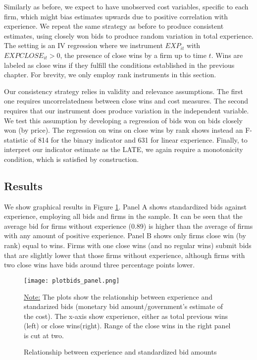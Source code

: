 Similarly as before, we expect to have unobserved cost variables, specific to each firm, which might bias estimates upwards due to positive correlation with experience. We repeat the same strategy as before to produce consistent estimates, using closely won bids to produce random variation in total experience. The setting is an IV regression where we instrument $EXP_{it}$ with $EXPCLOSE_{it}>0$, the presence of close wins by a firm up to time $t$. Wins are labeled as close wins if they fulfill the conditions established in the  previous chapter. For brevity, we only employ rank instruments in this section. %

Our consistency strategy relies in validity and relevance assumptions. The first one requires uncorrelatedness between close wins and cost measures. The second requires that our instrument does produce variation in the independent variable. We test this assumption by developing a regression of bids won on bids closely won (by price). The regression on wins on close wins by rank shows instead an F-statistic of 814 for the binary indicator and 631 for linear experience. Finally, to interpret our indicator estimate as the LATE, we again require a monotonicity condition, which is satisfied by construction.
%
\subsection{Results}
We show graphical results in Figure \ref{fig:plotbids_panel}. Panel A shows standardized bids against experience, employing all bids and firms in the sample. It can be seen that the average bid for firms without experience (0.89) is higher than the average of firms with any amount of positive experience. Panel B shows only firms close win (by rank) equal to wins.  Firms with one close wins (and no regular wins) submit bids that are slightly lower that those firms without experience, although firms with two close wins have bids around three percentage points lower.

\begin{figure}[H]
  \texttt{[image: plotbids\_panel.png]}
  \caption{Relationship between experience and standardized bid amounts}
  \vskip 0.5mm
  { \footnotesize \underline{Note:} The plots show the relationship between experience and standarized bids (monetary bid amount/government's estimate of the cost). The x-axis show experience, either as total previous wins (left) or close wins(right). Range of the close wins in the right panel is cut at two.\par}

  \label{fig:plotbids_panel}
\end{figure}

